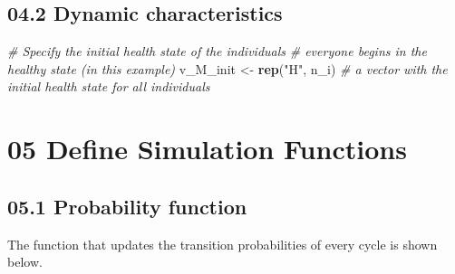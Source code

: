 \documentclass[
]{article}
\newenvironment{Shaded}{\begin{snugshade}}{\end{snugshade}}
\newcommand{\CommentTok}[1]{\textcolor[rgb]{0.56,0.35,0.01}{\textit{#1}}}
\newcommand{\KeywordTok}[1]{\textcolor[rgb]{0.13,0.29,0.53}{\textbf{#1}}}
\newcommand{\NormalTok}[1]{#1}
\newcommand{\StringTok}[1]{\textcolor[rgb]{0.31,0.60,0.02}{#1}}
\begin{document}
\hypertarget{dynamic-characteristics}{%
\subsection{04.2 Dynamic
characteristics}\label{dynamic-characteristics}}

\begin{Shaded}
\begin{Highlighting}[]
\CommentTok{# Specify the initial health state of the individuals }
\CommentTok{# everyone begins in the healthy state (in this example)}
\NormalTok{v_M_init  <-}\StringTok{ }\KeywordTok{rep}\NormalTok{(}\StringTok{"H"}\NormalTok{, n_i)   }\CommentTok{# a vector with the initial health state for all individuals   }
\end{Highlighting}
\end{Shaded}

\hypertarget{define-simulation-functions}{%
\section{05 Define Simulation
Functions}\label{define-simulation-functions}}

\hypertarget{probability-function}{%
\subsection{05.1 Probability function}\label{probability-function}}

The function that updates the transition probabilities of every cycle is
shown below.
\end{document}
